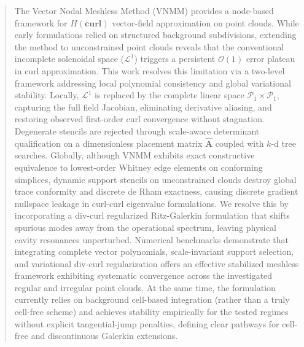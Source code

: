 \documentclass[preprint,12pt]{elsarticle}
\begin{document}
\begin{frontmatter}


    \begin{abstract}
        The Vector Nodal Meshless Method (VNMM) provides a node-based framework for $H(\mathbf{curl})$ vector-field approximation on point clouds. While early formulations relied on structured background subdivisions, extending the method to unconstrained point clouds reveals that the conventional incomplete solenoidal space ($\mathcal{L}^1$) triggers a persistent $\mathcal{O}(1)$ error plateau in curl approximation. This work resolves this limitation via a two-level framework addressing local polynomial consistency and global variational stability. Locally, $\mathcal{L}^1$ is replaced by the complete linear space $\mathcal{P}_1 \times \mathcal{P}_1$, capturing the full field Jacobian, eliminating derivative aliasing, and restoring observed first-order curl convergence without stagnation. Degenerate stencils are rejected through scale-aware determinant qualification on a dimensionless placement matrix $\widehat{\mathbf{A}}$ coupled with $k$-d tree searches. Globally, although VNMM exhibits exact constructive equivalence to lowest-order Whitney edge elements on conforming simplices, dynamic support stencils on unconstrained clouds destroy global trace conformity and discrete de Rham exactness, causing discrete gradient nullspace leakage in curl-curl eigenvalue formulations. We resolve this by incorporating a div-curl regularized Ritz-Galerkin formulation that shifts spurious modes away from the operational spectrum, leaving physical cavity resonances unperturbed. Numerical benchmarks demonstrate that integrating complete vector polynomials, scale-invariant support selection, and variational div-curl regularization offers an effective stabilized meshless framework exhibiting systematic convergence across the investigated regular and irregular point clouds. At the same time, the formulation currently relies on background cell-based integration (rather than a truly cell-free scheme) and achieves stability empirically for the tested regimes without explicit tangential-jump penalties, defining clear pathways for cell-free and discontinuous Galerkin extensions.
    \end{abstract}


\end{frontmatter}
\end{document}
